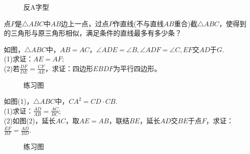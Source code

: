 \begin{figure}[H]
    \centering
    \resizebox{3cm}{!}{}
\end{figure}
\begin{figure}[H]
    \centering
    \resizebox{3cm}{!}{}
    \caption{反A字型}
\end{figure}
\begin{problem}
点$P$是$\triangle ABC$中$AB$边上一点，过点$P$作直线(不与直线$AB$重合)截$\triangle ABC$，使得到的三角形与原三角形相似，满足条件的直线最多有多少条？
\end{problem}
\begin{problem}
如图，$\triangle ABC$中，$AB=AC$，$\angle ADE=\angle B,\angle ADF=\angle C,EF$交$AD$于$G$. \\
(1)求证：$AE=AF$; \\
(2)若$\frac{DF}{DE}=\frac{CF}{AE}$，求证：四边形$EBDF$为平行四边形。 \\
\end{problem}
\begin{figure}[H]
    \centering
    \resizebox{4cm}{!}{}
    \caption{练习图}
\end{figure}
\begin{problem}
如图(1)，$\triangle ABC$中，$CA^2=CD·CB.$ \\
(1)求证：$\frac{AD}{AB}=\frac{AC}{BC}$; \\
(2)如图(2)，延长$AC$，取$AE=AB$，联结$BE$，延长$AD$交$BE$于点$F$，求证：$\frac{EF}{BF}=\frac{AD}{BD}.$ \\
\end{problem}
\begin{figure}[H]
    \centering
    \resizebox{8cm}{!}{}
    \caption{练习图}
\end{figure}
